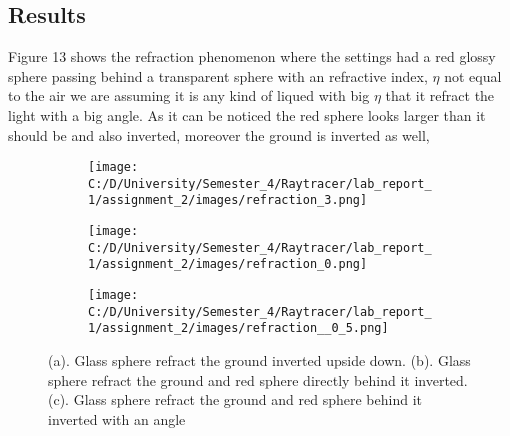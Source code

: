 \documentclass{article}
\begin{document}
\subsection{Results}
Figure 13 shows the refraction phenomenon where the settings had a red glossy sphere passing behind a transparent sphere with an refractive index, $\eta$ not equal to the air we are assuming it is any kind of liqued with big $\eta$ that it refract the light with a big angle. As it can be noticed the red sphere looks larger than it should be and also inverted, moreover the ground is inverted as well, 
\begin{figure}[H]
	\begin{subfigure}{.3\textwidth}
		\centering
		\texttt{[image: C:/D/University/Semester\_4/Raytracer/lab\_report\_1/assignment\_2/images/refraction\_3.png]}  
		\caption{}
		\label{fig:sub-first}
	\end{subfigure}
	\begin{subfigure}{.3\textwidth}
		\centering
		\texttt{[image: C:/D/University/Semester\_4/Raytracer/lab\_report\_1/assignment\_2/images/refraction\_0.png]}  
		\caption{}
		\label{fig:sub-second}
	\end{subfigure}
	\begin{subfigure}{.3\textwidth}
	\centering
	\texttt{[image: C:/D/University/Semester\_4/Raytracer/lab\_report\_1/assignment\_2/images/refraction\_\_0\_5.png]}  
	\caption{}
	\label{fig:sub-third}
\end{subfigure}

	\caption{(a). Glass sphere refract the ground inverted upside down. (b). Glass sphere refract the ground and red sphere directly behind it inverted. (c). Glass sphere refract the ground and red sphere behind it inverted with an angle}
	\label{fig:fig}
\end{figure}
\clearpage






\end{document}

